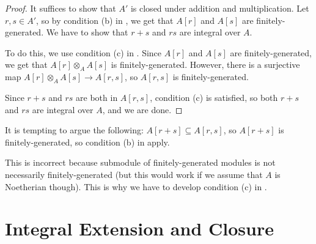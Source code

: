 \begin{proof}
    It suffices to show that $A'$ is closed under addition
    and multiplication.
    Let $r,s\in A'$,
    so by condition (b) in ,
    we get that $A[r]$ and $A[s]$ are finitely-generated.
    We have to show that $r+s$ and $rs$ are integral over $A$.
    
    To do this, we use condition (c) in .
    Since $A[r]$ and $A[s]$ are finitely-generated,
    we get that $A[r]\otimes_A A[s]$
    is finitely-generated.
    However, there is a surjective map
    $A[r]\otimes_A A[s]\to A[r,s]$,
    so $A[r, s]$ is finitely-generated.
    
    Since $r+s$ and $rs$ are both in $A[r,s]$,
    condition (c) is satisfied, so both $r+s$
    and $rs$ are integral over $A$, and we are done.
\end{proof}
\begin{remark}
    It is tempting to argue the following:
    $A[r+s]\subseteq A[r,s]$, so $A[r+s]$ is finitely-generated,
    so condition (b) in  apply.

    This is incorrect because submodule of finitely-generated
    modules is not necessarily finitely-generated
    (but this would work if we assume that $A$ is Noetherian though).
    This is why we have to develop condition (c)
    in .
\end{remark}
%
%
%
%
%
\section{Integral Extension and Closure}
